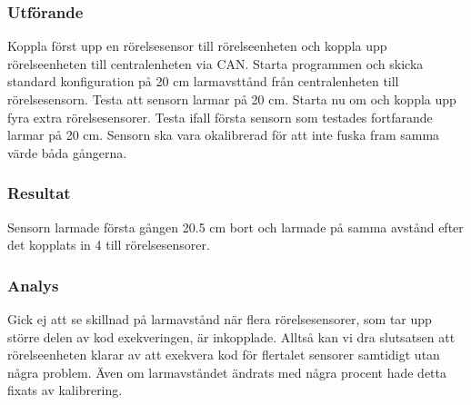 \subsubsection*{Utförande}
Koppla först upp en rörelsesensor till rörelseenheten och koppla upp rörelseenheten till centralenheten via CAN. Starta programmen och skicka standard konfiguration på 20 cm larmavsttånd från centralenheten till rörelsesensorn. Testa att sensorn larmar på 20 cm. Starta nu om och koppla upp fyra extra rörelsesensorer. Testa ifall första sensorn som testades fortfarande larmar på 20 cm. Sensorn ska vara okalibrerad för att inte fuska fram samma värde båda gångerna.

\subsubsection*{Resultat}
Sensorn larmade första gången 20.5 cm bort och larmade på samma avstånd efter det kopplats in 4 till rörelsesensorer.


\subsubsection*{Analys}
Gick ej att se skillnad på larmavstånd när flera rörelsesensorer, som tar upp större delen av kod exekveringen, är inkopplade. Alltså kan vi dra slutsatsen att rörelseenheten klarar av att exekvera kod för flertalet sensorer samtidigt utan några problem. Även om larmavståndet ändrats med några procent hade detta fixats av kalibrering.


